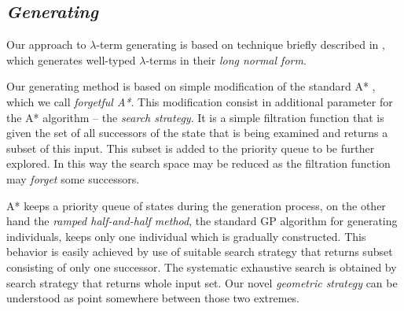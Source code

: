 \documentclass[11pt]{article}
\newcommand{\lterm}{$\lambda$-term\xspace}
\newcommand{\lterms}{$\lambda$-terms\xspace}
\begin{document}
\begin{article}




\subsection{\textit{Generating}}

Our approach to \lterm generating is based on technique briefly described in \citep{barendregt10}, which generates well-typed \lterms in their \textit{long normal form}. 

Our generating method is based on simple modification of the standard A* \citep{AIMA}, which we call \textit{forgetful A*}. This modification consist in additional parameter for the A* algorithm -- the \textit{search strategy}. It is a simple filtration function that is given the set of all successors of the state that is being examined and returns a subset of this input. This subset is added to the priority queue to be further explored. In this way the search space may be reduced as the filtration function may \textit{forget} some successors.

A* keeps a priority queue of states during the generation process, on the other hand the \textit{ramped half-and-half method}, the standard GP algorithm for generating individuals, keeps only one individual which is gradually constructed. This behavior is easily achieved by use of suitable search strategy that returns subset consisting of only one successor. The systematic exhaustive search is obtained by search strategy that returns whole input set. Our novel \textit{geometric strategy} can be understood as point somewhere between those two extremes.





\end{article}
\end{document}
